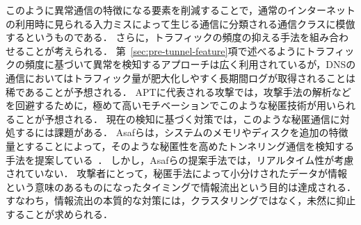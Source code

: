 このように異常通信の特徴になる要素を削減することで，通常のインターネットの利用時に見られる入力ミスによって生じる通信に分類される通信クラスに模倣するというものである．
さらに，トラフィックの頻度の抑える手法を組み合わせることが考えられる．
第~\ref{sec:pre-tunnel-feature}項で述べるようにトラフィックの頻度に基づいて異常を検知するアプローチは広く利用されているが，DNSの通信においてはトラフィック量が肥大化しやすく長期間ログが取得されることは稀であることが予想される．
APTに代表される攻撃では，攻撃手法の解析などを回避するために，極めて高いモチベーションでこのような秘匿技術が用いられることが予想される．
現在の検知に基づく対策では，このような秘匿通信に対処するには課題がある．
Asafらは，システムのメモリやディスクを追加の特徴量とすることによって，そのような秘匿性を高めたトンネリング通信を検知する手法を提案している~\cite{asaf}．
しかし，Asafらの提案手法では，リアルタイム性が考慮されていない．
攻撃者にとって，秘匿手法によって小分けされたデータが情報という意味のあるものになったタイミングで情報流出という目的は達成される．
すなわち，情報流出の本質的な対策には，クラスタリングではなく，未然に抑止することが求められる．
